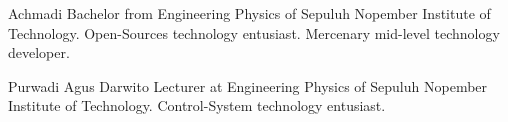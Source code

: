 \documentclass[journal]{IEEEtran}
\begin{document}
\begin{IEEEbiography}{Achmadi}
Bachelor from Engineering Physics of Sepuluh Nopember Institute of Technology.
Open-Sources technology entusiast.
Mercenary mid-level technology developer.
\end{IEEEbiography}

\begin{IEEEbiography}{Purwadi Agus Darwito}
Lecturer at Engineering Physics of Sepuluh Nopember Institute of Technology.
Control-System technology entusiast.
\end{IEEEbiography}
\end{document}
